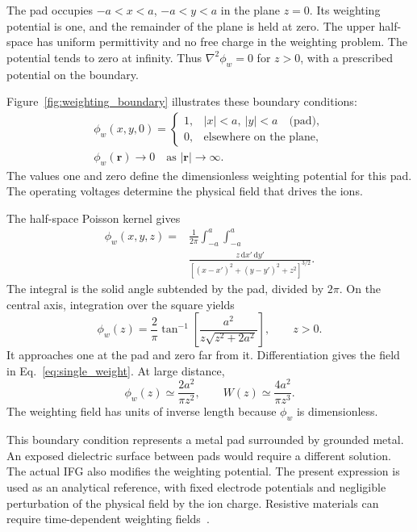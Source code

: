 \documentclass[pdflatex,iicol,sn-mathphys-num]{sn-jnl}
\newcommand{\dd}{\mathrm{d}}
\begin{document}
The pad occupies $-a<x<a$, $-a<y<a$ in the plane $z=0$. Its weighting potential is one, and the remainder of the plane is held at zero. The upper half-space has uniform permittivity and no free charge in the weighting problem. The potential tends to zero at infinity. Thus $\nabla^2\phi_w=0$ for $z>0$, with a prescribed potential on the boundary.

Figure~\ref{fig:weighting_boundary} illustrates these boundary conditions:
\begin{equation}
 \begin{gathered}
 \phi_w(x,y,0)=
 \begin{cases}
  1, & |x|<a,\ |y|<a \quad \text{(pad)},\\
  0, & \text{elsewhere on the plane},
 \end{cases}\\
 \phi_w(\mathbf r)\longrightarrow0
 \quad\text{as }|\mathbf r|\longrightarrow\infty.
 \end{gathered}
 \label{eq:weighting_boundary}
\end{equation}
The values one and zero define the dimensionless weighting potential for this
pad. The operating voltages determine the physical field that drives the ions.

The half-space Poisson kernel gives~\cite{salazar2021}
\begin{equation}
 \begin{aligned}
 \phi_w(x,y,z)={}&\frac{1}{2\pi}\int_{-a}^{a}\int_{-a}^{a}\\
 &\frac{z\,\dd x'\,\dd y'}{[(x-x')^2+(y-y')^2+z^2]^{3/2}}.
 \end{aligned}
 \label{eq:app_poisson}
\end{equation}
The integral is the solid angle subtended by the pad, divided by $2\pi$. On the central axis, integration over the square yields
\begin{equation}
 \phi_w(z)=\frac{2}{\pi}\tan^{-1}
 \left[\frac{a^2}{z\sqrt{z^2+2a^2}}\right],\qquad z>0.
 \label{eq:app_square_phi}
\end{equation}
It approaches one at the pad and zero far from it. Differentiation gives the field in Eq.~\eqref{eq:single_weight}. At large distance,
\begin{equation}
 \phi_w(z)\simeq\frac{2a^2}{\pi z^2},\qquad
 W(z)\simeq\frac{4a^2}{\pi z^3}.
\end{equation}
The weighting field has units of inverse length because $\phi_w$ is dimensionless.

This boundary condition represents a metal pad surrounded by grounded metal. An exposed dielectric surface between pads would require a different solution. The actual IFG also modifies the weighting potential. The present expression is used as an analytical reference, with fixed electrode potentials and negligible perturbation of the physical field by the ion charge. Resistive materials can require time-dependent weighting fields~\cite{riegler2016,riegler2019}.
\end{document}
